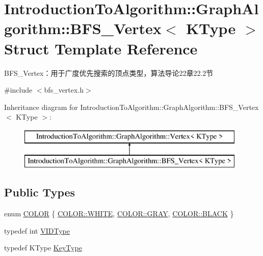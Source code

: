 \hypertarget{struct_introduction_to_algorithm_1_1_graph_algorithm_1_1_b_f_s___vertex}{}\section{Introduction\+To\+Algorithm\+:\+:Graph\+Algorithm\+:\+:B\+F\+S\+\_\+\+Vertex$<$ K\+Type $>$ Struct Template Reference}
\label{struct_introduction_to_algorithm_1_1_graph_algorithm_1_1_b_f_s___vertex}


B\+F\+S\+\_\+\+Vertex：用于广度优先搜索的顶点类型，算法导论22章22.2节  




{\ttfamily \#include $<$bfs\+\_\+vertex.\+h$>$}

Inheritance diagram for Introduction\+To\+Algorithm\+:\+:Graph\+Algorithm\+:\+:B\+F\+S\+\_\+\+Vertex$<$ K\+Type $>$\+:\begin{figure}[H]
\begin{center}
\leavevmode
\includegraphics[height=2.000000cm]{struct_introduction_to_algorithm_1_1_graph_algorithm_1_1_b_f_s___vertex}
\end{center}
\end{figure}
\subsection*{Public Types}
\begin{DoxyCompactItemize}
\item 
enum \hyperlink{struct_introduction_to_algorithm_1_1_graph_algorithm_1_1_b_f_s___vertex_a3f00f12565def71750f1f163e0e52305}{C\+O\+L\+O\+R} \{ \hyperlink{struct_introduction_to_algorithm_1_1_graph_algorithm_1_1_b_f_s___vertex_a3f00f12565def71750f1f163e0e52305ab5bf627e448384cf3a4c35121ca6008d}{C\+O\+L\+O\+R\+::\+W\+H\+I\+T\+E}, 
\hyperlink{struct_introduction_to_algorithm_1_1_graph_algorithm_1_1_b_f_s___vertex_a3f00f12565def71750f1f163e0e52305a48bf014c704c9eaae100a98006a37bf7}{C\+O\+L\+O\+R\+::\+G\+R\+A\+Y}, 
\hyperlink{struct_introduction_to_algorithm_1_1_graph_algorithm_1_1_b_f_s___vertex_a3f00f12565def71750f1f163e0e52305a08d0012388564e95c3b4a7407cf04965}{C\+O\+L\+O\+R\+::\+B\+L\+A\+C\+K}
 \}
\item 
typedef int \hyperlink{struct_introduction_to_algorithm_1_1_graph_algorithm_1_1_b_f_s___vertex_a62cef758843cdaeefae2fc196f6bdb46}{V\+I\+D\+Type}
\item 
typedef K\+Type \hyperlink{struct_introduction_to_algorithm_1_1_graph_algorithm_1_1_b_f_s___vertex_a1e47ba34939458c68d7ccee8ebeccad2}{Key\+Type}
\end{DoxyCompactItemize}
